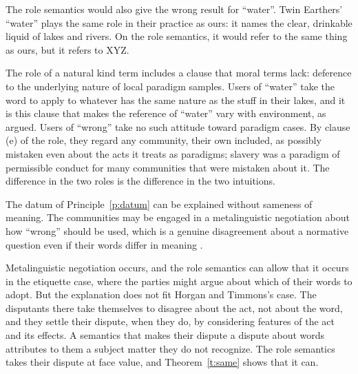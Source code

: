 \documentclass{situationist-preprint}
\begin{document}
\begin{objection}
The role semantics would also give the wrong result for \enquote{water}. Twin Earthers' \enquote{water} plays the same role in their practice as ours: it names the clear, drinkable liquid of lakes and rivers. On the role semantics, it would refer to the same thing as ours, but it refers to XYZ.
\end{objection}

\begin{reply}
The role of a natural kind term includes a clause that moral terms lack: deference to the underlying nature of local paradigm samples. Users of \enquote{water} take the word to apply to whatever has the same nature as the stuff in their lakes, and it is this clause that makes the reference of \enquote{water} vary with environment, as \citet{Putnam1975} argued. Users of \enquote{wrong} take no such attitude toward paradigm cases. By clause (e) of the role, they regard any community, their own included, as possibly mistaken even about the acts it treats as paradigms; slavery was a paradigm of permissible conduct for many communities that were mistaken about it. The difference in the two roles is the difference in the two intuitions.
\end{reply}

\begin{objection}
The datum of Principle~\ref{p:datum} can be explained without sameness of meaning. The communities may be engaged in a metalinguistic negotiation about how \enquote{wrong} should be used, which is a genuine disagreement about a normative question even if their words differ in meaning \citep{PlunkettSundell2013}.
\end{objection}

\begin{reply}
Metalinguistic negotiation occurs, and the role semantics can allow that it occurs in the etiquette case, where the parties might argue about which of their words to adopt. But the explanation does not fit Horgan and Timmons's case. The disputants there take themselves to disagree about the act, not about the word, and they settle their dispute, when they do, by considering features of the act and its effects. A semantics that makes their dispute a dispute about words attributes to them a subject matter they do not recognize. The role semantics takes their dispute at face value, and Theorem~\ref{t:same} shows that it can.
\end{reply}
\end{document}
